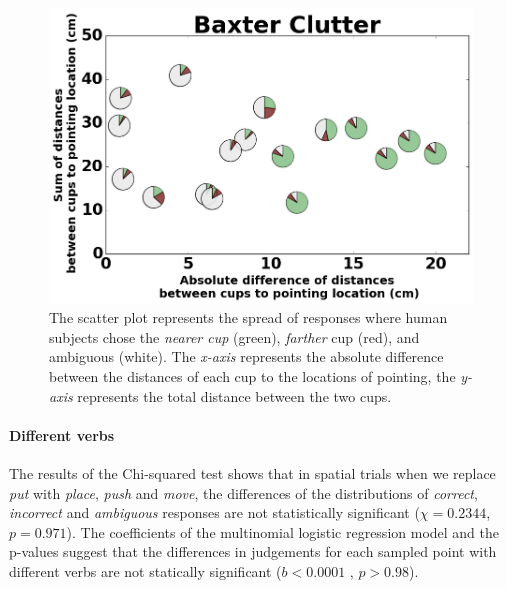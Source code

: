 \begin{figure}[H]
    \centering
    \includegraphics[width=\linewidth]{figures/baxter_Clutter_granular.png}
    \caption{
    The scatter plot represents the spread of responses where human subjects chose the \textit{nearer cup} (green), \textit{farther} cup (red), and ambiguous (white). 
    The \textit{x-axis} represents the absolute difference between the distances of each cup to the locations of pointing, the \textit{y-axis} represents the total distance between the two cups.
    }
    \label{fig:cluttered}
\end{figure}

\paragraph{Different verbs}
The results of the Chi-squared test shows that in spatial trials when we replace \textit{put} with \textit{place}, \textit{push} and \textit{move}, the differences of the distributions of \textit{correct}, \textit{incorrect} and \textit{ambiguous} responses are not statistically significant ($\chi=0.2344 $, $p = 0.971$). The coefficients of the multinomial logistic regression model and the p-values suggest that the differences in judgements for each sampled point with different verbs are not statically significant ($b<0.0001$ , $p>0.98$).



